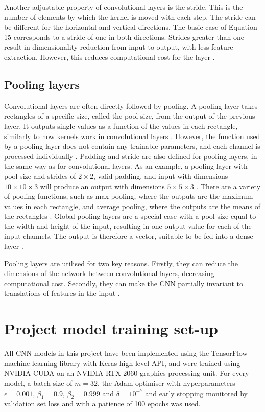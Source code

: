 \documentclass[12pt]{article}
\begin{document}
Another adjustable property of convolutional layers is the stride. This is the number of elements by which the kernel is moved with each step. The stride can be different for the horizontal and vertical directions. The basic case of Equation 15 corresponds to a stride of one in both directions. Strides greater than one result in dimensionality reduction from input to output, with less feature extraction. However, this reduces computational cost for the layer \cite{Aghdam17, Goodfellow16}.

\subsection{Pooling layers}
Convolutional layers are often directly followed by pooling. A pooling layer takes rectangles of a specific size, called the pool size, from the output of the previous layer. It outputs single values as a function of the values in each rectangle, similarly to how kernels work in convolutional layers \cite{Aghdam17, Goodfellow16}. However, the function used by a pooling layer does not contain any trainable parameters, and each channel is processed individually \cite{Aghdam17, Goodfellow16}. Padding and stride are also defined for pooling layers, in the same way as for convolutional layers. As an example, a pooling layer with pool size and strides of $2 \times 2$, valid padding, and input with dimensions $10 \times 10 \times 3$ will produce an output with dimensions $5 \times 5 \times 3$ \cite{Aghdam17, Goodfellow16}. There are a variety of pooling functions, such as max pooling, where the outputs are the maximum values in each rectangle, and average pooling, where the outputs are the means of the rectangles \cite{Goodfellow16}. Global pooling layers are a special case with a pool size equal to the width and height of the input, resulting in one output value for each of the input channels. The output is therefore a vector, suitable to be fed into a dense layer \cite{Aghdam17}.

Pooling layers are utilised for two key reasons. Firstly, they can reduce the dimensions of the network between convolutional layers, decreasing computational cost. Secondly, they can make the CNN partially invariant to translations of features in the input \cite{Aghdam17, Goodfellow16}.
\section{Project model training set-up}
All CNN models in this project have been implemented using the TensorFlow machine learning library with Keras high-level API, and were trained using NVIDIA CUDA on an NVIDIA RTX 2060 graphics processing unit. For every model, a batch size of $m=32$, the Adam optimiser with hyperparameters $\epsilon=0.001$, $\beta_1=0.9$, $\beta_2=0.999$ and $\delta=10^{-7}$ and early stopping  monitored by validation set loss and with a patience of 100 epochs was used.
\end{document}
